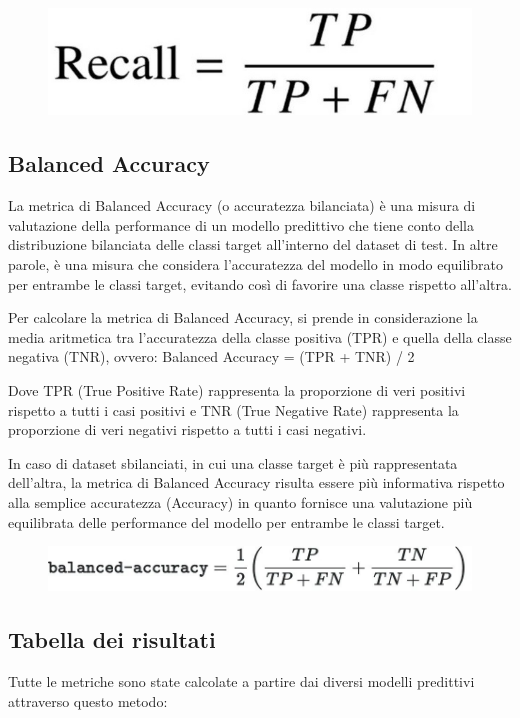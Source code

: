 \begin{figure}
    \begin{center}    
        \includegraphics[width=0.5\linewidth]{images/image49.jpeg}
    \end{center}
\end{figure}

\subsection{Balanced Accuracy}
La metrica di Balanced Accuracy (o accuratezza bilanciata) è una misura di valutazione della performance di un modello predittivo che tiene conto della distribuzione bilanciata delle classi target all'interno del dataset di test. In altre parole, è una misura che considera l'accuratezza del modello in modo equilibrato per entrambe le classi target, evitando così di favorire una classe rispetto all'altra.

Per calcolare la metrica di Balanced Accuracy, si prende in considerazione la media aritmetica tra l'accuratezza della classe positiva (TPR) e quella della classe negativa (TNR), ovvero:
Balanced Accuracy = (TPR + TNR) / 2
 
Dove TPR (True Positive Rate) rappresenta la proporzione di veri positivi rispetto a tutti i casi positivi e TNR (True Negative Rate) rappresenta la proporzione di veri negativi rispetto a tutti i casi negativi.

In caso di dataset sbilanciati, in cui una classe target è più rappresentata dell'altra, la metrica di Balanced Accuracy risulta essere più informativa rispetto alla semplice accuratezza (Accuracy) in quanto fornisce una valutazione più equilibrata delle performance del modello per entrambe le classi target.

\begin{figure}
    \begin{center}    
        \includegraphics[width=0.9\linewidth]{images/image50.jpeg}
    \end{center}
\end{figure}

\subsection{Tabella dei risultati}
Tutte le metriche sono state calcolate a partire dai diversi modelli predittivi attraverso questo metodo:

